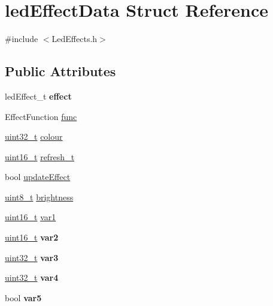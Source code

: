 \hypertarget{structledEffectData}{}\section{led\+Effect\+Data Struct Reference}
\label{structledEffectData}


{\ttfamily \#include $<$Led\+Effects.\+h$>$}

\subsection*{Public Attributes}
\begin{DoxyCompactItemize}
\item 
\mbox{\label{structledEffectData_a87074850f351bccf49dab4ff51f7d404}} 
led\+Effect\+\_\+t {\bfseries effect}
\item 
Effect\+Function \hyperlink{structledEffectData_afda152477a636903c30cdb311e4d739b}{func}
\item 
\hyperlink{vl53l0x__types_8h_a435d1572bf3f880d55459d9805097f62}{uint32\+\_\+t} \hyperlink{structledEffectData_ab37d8733a0fc0c336752e382a53c2e6d}{colour}
\item 
\hyperlink{vl53l0x__types_8h_a273cf69d639a59973b6019625df33e30}{uint16\+\_\+t} \hyperlink{structledEffectData_af3091722f500797cff2896050b7ac3b4}{refresh\+\_\+t}
\item 
bool \hyperlink{structledEffectData_a5f73d846268058bf03c0cdea345ffa1b}{update\+Effect}
\item 
\hyperlink{vl53l0x__types_8h_aba7bc1797add20fe3efdf37ced1182c5}{uint8\+\_\+t} \hyperlink{structledEffectData_a8d68875aadb518d5292e93d79918d0ae}{brightness}
\item 
\hyperlink{vl53l0x__types_8h_a273cf69d639a59973b6019625df33e30}{uint16\+\_\+t} \hyperlink{structledEffectData_a980ab6cc1f7a667f35f5f56240dfd0e3}{var1}
\item 
\mbox{\label{structledEffectData_a9a4ad08dc2c3ff67ae52e2f7544402ca}} 
\hyperlink{vl53l0x__types_8h_a273cf69d639a59973b6019625df33e30}{uint16\+\_\+t} {\bfseries var2}
\item 
\mbox{\label{structledEffectData_a0a9a8e27e0e818f4c57d5764a255ef0a}} 
\hyperlink{vl53l0x__types_8h_a435d1572bf3f880d55459d9805097f62}{uint32\+\_\+t} {\bfseries var3}
\item 
\mbox{\label{structledEffectData_a64e20cccc9348363a0ba12bb5384ea78}} 
\hyperlink{vl53l0x__types_8h_a435d1572bf3f880d55459d9805097f62}{uint32\+\_\+t} {\bfseries var4}
\item 
\mbox{\label{structledEffectData_a94fe27a47d0b6946a95a21e3b4bac27b}} 
bool {\bfseries var5}
\end{DoxyCompactItemize}


